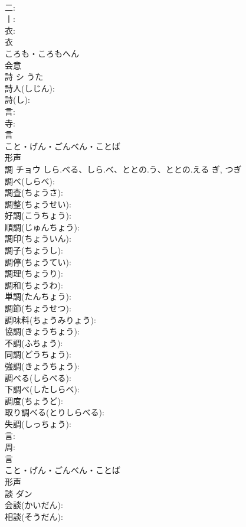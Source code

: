 \documentclass[8pt]{extreport}
\begin{document}
\begin{CJK}{UTF8}{min}
\\	二: 
\\	丨: 
\\	衣: 
\\	衣	
\\	ころも・ころもへん	
\\	会意 
\\	詩	シ	うた		
\\	詩人(しじん): 
\\	詩(し): 
\\	言: 
\\	寺: 
\\	言	
\\	こと・げん・ごんべん・ことば	
\\	形声 
\\	調	チョウ	しら.べる、しら.べ、ととの.う、ととの.える	ぎ, つぎ	
\\	調べ(しらべ): 
\\	調査(ちょうさ): 
\\	調整(ちょうせい): 
\\	好調(こうちょう): 
\\	順調(じゅんちょう): 
\\	調印(ちょういん): 
\\	調子(ちょうし): 
\\	調停(ちょうてい): 
\\	調理(ちょうり): 
\\	調和(ちょうわ): 
\\	単調(たんちょう): 
\\	調節(ちょうせつ): 
\\	調味料(ちょうみりょう): 
\\	協調(きょうちょう): 
\\	不調(ふちょう): 
\\	同調(どうちょう): 
\\	強調(きょうちょう): 
\\	調べる(しらべる): 
\\	下調べ(したしらべ): 
\\	調度(ちょうど): 
\\	取り調べる(とりしらべる): 
\\	失調(しっちょう): 
\\	言: 
\\	周: 
\\	言	
\\	こと・げん・ごんべん・ことば	
\\	形声 
\\	談	ダン			
\\	会談(かいだん): 
\\	相談(そうだん): 

\end{CJK}
\end{document}
